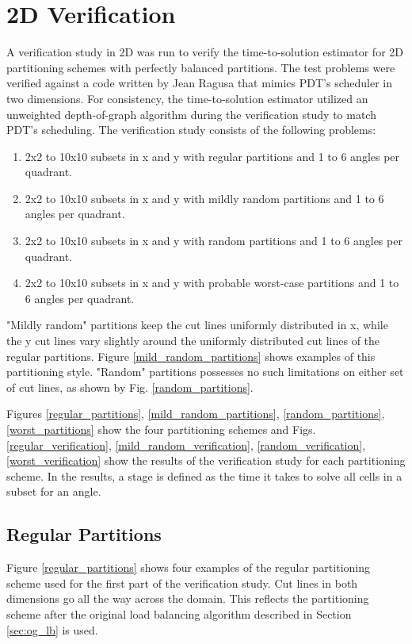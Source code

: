 \section{2D Verification}

A verification study in 2D was run to verify the time-to-solution estimator for 2D partitioning schemes with perfectly balanced partitions. The test problems were verified against a code written by Jean Ragusa that mimics PDT's scheduler in two dimensions. For consistency, the time-to-solution estimator utilized an unweighted depth-of-graph algorithm during the verification study to match PDT's scheduling. The verification study consists of the following problems:
\begin{enumerate}
	\item 2x2 to 10x10 subsets in x and y with regular partitions and 1 to 6 angles per quadrant.
	\item 2x2 to 10x10 subsets in x and y with mildly random partitions and 1 to 6 angles per quadrant.
	\item  2x2 to 10x10 subsets in x and y with random partitions and 1 to 6 angles per quadrant.
	\item  2x2 to 10x10 subsets in x and y with probable worst-case partitions and 1 to 6 angles per quadrant.
\end{enumerate}

"Mildly random" partitions keep the cut lines uniformly distributed in x, while the y cut lines vary slightly around the uniformly distributed cut lines of the regular partitions. Figure \ref{mild_random_partitions} shows examples of this partitioning style. "Random" partitions possesses no such limitations on either set of cut lines, as shown by Fig. \ref{random_partitions}. 

Figures \ref{regular_partitions}, \ref{mild_random_partitions}, \ref{random_partitions}, \ref{worst_partitions} show the four partitioning schemes and Figs. \ref{regular_verification}, \ref{mild_random_verification}, \ref{random_verification}, \ref{worst_verification} show the results of the verification study for each partitioning scheme. In the results, a stage is defined as the time it takes to solve all cells in a subset for an angle.  

\subsection{Regular Partitions}

Figure \ref{regular_partitions} shows four examples of the regular partitioning scheme used for the first part of the verification study. Cut lines in both dimensions go all the way across the domain. This reflects the partitioning scheme after the original load balancing algorithm described in Section \ref{sec:og_lb} is used.

